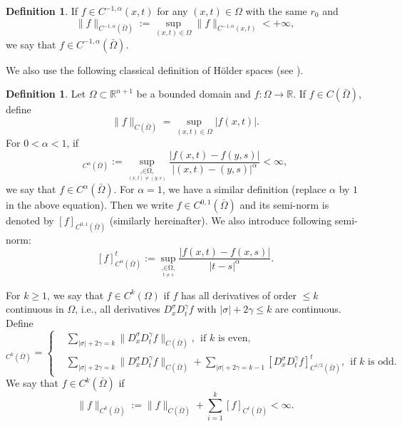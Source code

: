 \documentclass[preprint,12pt]{elsarticle}
\theoremstyle{definition}
\newtheorem{definition}[theorem]{Definition}
\theoremstyle{remark}
\numberwithin{equation}{section}
\begin{document}
\begin{definition}
If $f\in C^{-1, \alpha}(x,t)$ for any $(x,t)\in \Omega$ with the same $r_0$ and
\begin{equation*}
  \|f\|_{C^{-1,\alpha}(\bar{\Omega})}:= \sup_{(x,t)\in \Omega} \|f\|_{C^{-1,\alpha}(x,t)}<+\infty,
\end{equation*}
we say that $f\in C^{-1,\alpha}(\bar{\Omega})$.
\end{definition}

We also use the following classical definition of H\"{o}lder spaces (see \cite[Chap. 3]{Chen}).
\begin{definition}\label{de1.1}
Let $\Omega\subset \mathbb{R}^{n+1}$ be a bounded domain and $f:\Omega\rightarrow \mathbb{R}$. If $f\in C(\bar{\Omega})$, define
\begin{equation*}
\|f\|_{C(\bar{\Omega})}=\sup_{(x,t)\in \Omega}|f(x,t)|.
\end{equation*}
For $0<\alpha< 1$, if
\begin{equation*}
[f]_{C^{\alpha}(\bar{\Omega})}
:=\sup_{\mathop{(x,t),(y,s)\in \Omega,}\limits_{(x,t)\neq (y,s)}}\frac{|f(x,t)-f(y,s)|}{|(x,t)-(y,s)|^{\alpha}}<\infty,
\end{equation*}
we say that $f\in C^{\alpha}(\bar{\Omega})$. For $\alpha=1$, we have a similar definition (replace $\alpha$ by $1$ in the above equation). Then we write $f\in C^{0,1}(\bar{\Omega})$ and its semi-norm is denoted by $[f]_{C^{0,1}(\bar{\Omega})}$ (similarly hereinafter). We also introduce following semi-norm:
\begin{equation*}
[f]^{t}_{C^{\alpha}(\bar{\Omega})}:=\sup_{\mathop{(x,t),(x,s)\in \Omega,}\limits_{t\neq s}}
\frac{|f(x,t)-f(x,s)|}{|t-s|^{\alpha}}.
\end{equation*}

For $k\geq 1$, we say that $f\in C^k(\Omega)$ if $f$ has all derivatives of order $\leq k$ continuous in $\Omega$, i.e., all derivatives $D_{x}^{\sigma}D_{t}^{\gamma}f$ with $|\sigma|+2\gamma\leq k$ are continuous. Define
\begin{equation*}
  [f]_{C^{k}(\bar{\Omega})}=\left\{
  \begin{aligned}
&\sum_{|\sigma|+2\gamma= k}\|D_{x}^{\sigma}D_{t}^{\gamma}f\|_{C(\bar{\Omega})},~~
\mbox{if $k$ is even},~~\\
&\sum_{|\sigma|+2\gamma= k}\|D_{x}^{\sigma}D_{t}^{\gamma}f\|_{C(\bar{\Omega})}
+\sum_{|\sigma|+2\gamma= k-1}
[D_{x}^{\sigma}D_{t}^{\gamma}f]^{t}_{C^{1/2}(\bar{\Omega})},~~
\mbox{if $k$ is odd}.
  \end{aligned}
  \right.
\end{equation*}
We say that $f\in C^{k}(\bar\Omega)$ if
\begin{equation*}
\|f\|_{C^{k}(\bar{\Omega})}:=\|f\|_{C(\bar{\Omega})}+\sum_{i=1}^{k}[f]_{C^i(\bar{\Omega})}<\infty.
\end{equation*}


\end{definition}
\end{document}
